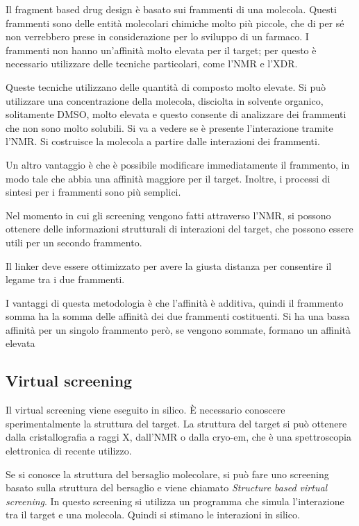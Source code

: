 Il fragment based drug design è basato sui frammenti di una molecola.
Questi frammenti sono delle entità molecolari chimiche molto più
piccole, che di per sé non verrebbero prese in considerazione per lo
sviluppo di un farmaco. I frammenti non hanno un'affinità molto elevata
per il target; per questo è necessario utilizzare delle tecniche
particolari, come l'NMR e l'XDR.

Queste tecniche utilizzano delle quantità di composto molto elevate. Si
può utilizzare una concentrazione della molecola, disciolta in solvente
organico, solitamente DMSO, molto elevata e questo consente di
analizzare dei frammenti che non sono molto solubili. Si va a vedere se
è presente l'interazione tramite l'NMR.{} Si costruisce la molecola a
partire dalle interazioni dei frammenti.

Un altro vantaggio è che è possibile modificare immediatamente il
frammento, in modo tale che abbia una affinità maggiore per il target.
Inoltre, i processi di sintesi per i frammenti sono più semplici.

Nel momento in cui gli screening vengono fatti attraverso l'NMR, si
possono ottenere delle informazioni strutturali di interazioni del
target, che possono essere utili per un secondo frammento.


Il linker deve essere ottimizzato per avere la giusta distanza per
consentire il legame tra i due frammenti.

I vantaggi di questa metodologia è che l'affinità è additiva, quindi il
frammento somma ha la somma delle affinità dei due frammenti
costituenti. Si ha una bassa affinità per un singolo frammento però, se
vengono sommate, formano un affinità elevata

\subsection{Virtual screening}

Il virtual screening viene eseguito in silico. È necessario conoscere
sperimentalmente la struttura del target. La struttura del target si può
ottenere dalla cristallografia a raggi X, dall'NMR o dalla cryo-em, che
è una spettroscopia elettronica di recente utilizzo.

Se si conosce la struttura del bersaglio molecolare, si può fare uno
screening basato sulla struttura del bersaglio e viene chiamato
\emph{Structure based virtual screening}. In questo screening si
utilizza un programma che simula l'interazione tra il target e una
molecola. Quindi si stimano le interazioni in silico.

